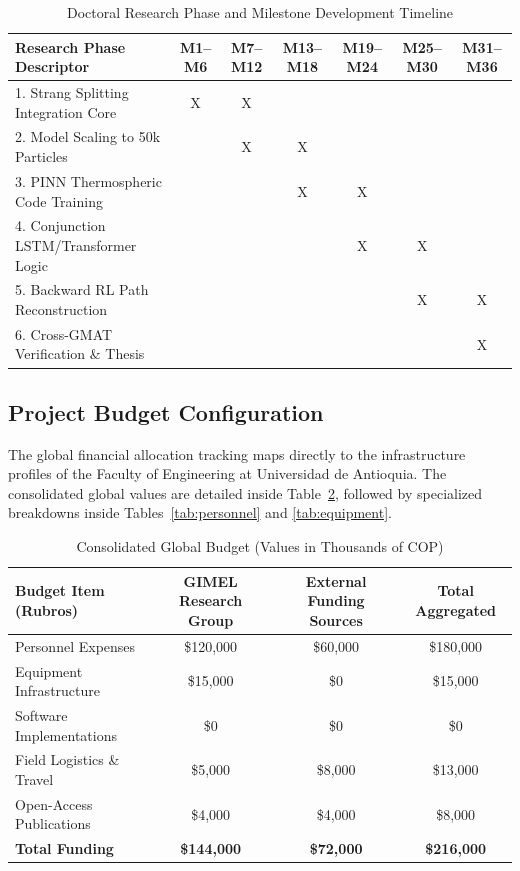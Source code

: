 \documentclass[11pt,letterpaper]{article}
\begin{document}
\begin{table}[h!]
\caption{\label{tab:cronograma} Doctoral Research Phase and Milestone Development Timeline}
\centering
\begin{tabular}{lcccccc}
\hline
\textbf{Research Phase Descriptor} & \textbf{M1--M6} & \textbf{M7--M12} & \textbf{M13--M18} & \textbf{M19--M24} & \textbf{M25--M30} & \textbf{M31--M36} \\ \hline
1. Strang Splitting Integration Core & X & X & & & & \\
2. Model Scaling to 50k Particles & & X & X & & & \\
3. PINN Thermospheric Code Training & & & X & X & & \\
4. Conjunction LSTM/Transformer Logic & & & & X & X & \\
5. Backward RL Path Reconstruction & & & & & X & X \\
6. Cross-GMAT Verification \& Thesis & & & & & & X \\ \hline
\end{tabular}
\end{table}

\subsection{Project Budget Configuration}
The global financial allocation tracking maps directly to the infrastructure profiles of the Faculty of Engineering at Universidad de Antioquia. The consolidated global values are detailed inside Table~\ref{tab:budget}, followed by specialized breakdowns inside Tables~\ref{tab:personnel} and \ref{tab:equipment}.

\begin{table}[h!]
\caption{\label{tab:budget} Consolidated Global Budget (Values in Thousands of COP)}
\centering
\begin{tabular}{lccc}
\hline
\textbf{Budget Item (Rubros)} & \textbf{GIMEL Research Group} & \textbf{External Funding Sources} & \textbf{Total Aggregated} \\ \hline
Personnel Expenses            & \$120,000                     & \$60,000                          & \$180,000                 \\
Equipment Infrastructure      & \$15,000                      & \$0                               & \$15,000                  \\
Software Implementations       & \$0                           & \$0                               & \$0                       \\
Field Logistics \& Travel     & \$5,000                       & \$8,000                           & \$13,000                  \\
Open-Access Publications      & \$4,000                       & \$4,000                           & \$8,000                   \\ \hline
\textbf{Total Funding}        & \textbf{\$144,000}            & \textbf{\$72,000}                 & \textbf{\$216,000}        \\ \hline
\end{tabular}
\end{table}
\end{document}

